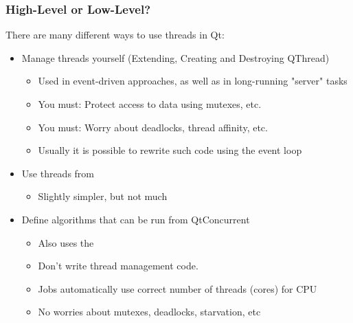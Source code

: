 \begin{slide}
\frametitle{High-Level or Low-Level?}
There are many different ways to use threads in Qt: 
\begin{itemize}
\item Manage threads yourself (Extending, Creating and Destroying QThread)
    \begin{itemize}
        \item Used in event-driven approaches, as well as in long-running
        "server" tasks 
        \item You must: Protect access to data using mutexes, etc.
        \item You must: Worry about deadlocks, thread affinity, etc. 
        \item Usually it is possible to rewrite such code using the event loop
    \end{itemize} 
\item Use threads from 
    \begin{itemize}
        \item Slightly simpler, but not much
    \end{itemize}
\item Define algorithms that can be run from QtConcurrent
    \begin{itemize}
    \item Also uses the  
    \item Don't write thread management code.
    \item Jobs automatically use correct number of threads (cores) for CPU
    \item No worries about mutexes, deadlocks, starvation, etc
    \end{itemize}
\end{itemize}
\end{slide}

